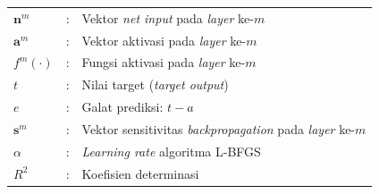 \begin{tabularx}{\textwidth}{>{\itshape}l l X}
$\mathbf{n}^m$  & : & Vektor \emph{net input} pada \emph{layer} ke-$m$ \\
$\mathbf{a}^m$  & : & Vektor aktivasi pada \emph{layer} ke-$m$ \\
$f^m(\cdot)$    & : & Fungsi aktivasi pada \emph{layer} ke-$m$ \\
$t$             & : & Nilai target (\emph{target output}) \\
$e$             & : & Galat prediksi: $t - a$ \\
$\mathbf{s}^m$  & : & Vektor sensitivitas \emph{backpropagation} pada \emph{layer} ke-$m$ \\
$\alpha$        & : & \emph{Learning rate} algoritma L-BFGS \\
$R^2$           & : & Koefisien determinasi \\
\end{tabularx}

\renewcommand{\arraystretch}{1}
